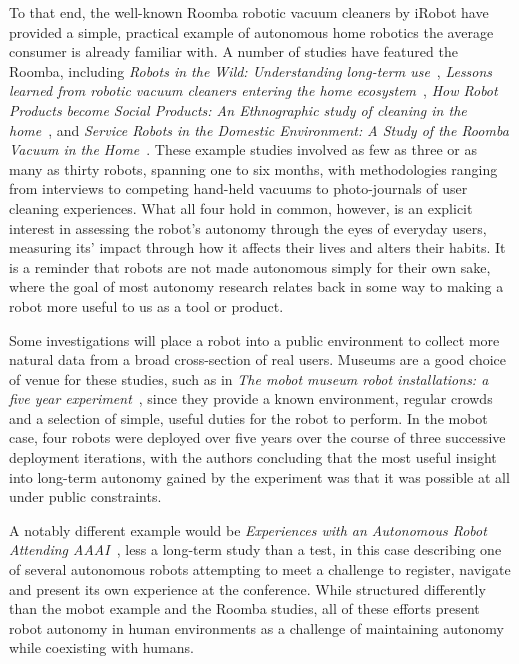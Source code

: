 \documentclass{sfuthesis}
\begin{document}
To that end, the well-known Roomba robotic vacuum cleaners by iRobot have provided a simple, practical example of autonomous home robotics the average consumer is already familiar with. A number of studies have featured the Roomba, including \textit{Robots in the Wild: Understanding long-term use}~\cite{sung2009robots}, \textit{Lessons learned from robotic vacuum cleaners entering the home ecosystem}~\cite{vaussard2014lessons}, \textit{How Robot Products become Social Products: An Ethnographic study of cleaning in the home}~\cite{forlizzi2007robotic}, and \textit{Service Robots in the Domestic Environment: A Study of the Roomba Vacuum in the Home}~\cite{forlizzi2006service}. These example studies involved as few as three or as many as thirty robots, spanning one to six months, with methodologies ranging from interviews to competing hand-held vacuums to photo-journals of user cleaning experiences. What all four hold in common, however, is an explicit interest in assessing the robot's autonomy through the eyes of everyday users, measuring its' impact through how it affects their lives and alters their habits. It is a reminder that robots are not made autonomous simply for their own sake, where the goal of most autonomy research relates back in some way to making a robot more useful to us as a tool or product.

Some investigations will place a robot into a public environment to collect more natural data from a broad cross-section of real users. Museums are a good choice of venue for these studies, such as in \textit{The mobot museum robot installations: a five year experiment}~\cite{nourbakhsh2003mobot}, since they provide a known environment, regular crowds and a selection of simple, useful duties for the robot to perform. In the mobot case, four robots were deployed over five years over the course of three successive deployment iterations, with the authors concluding that the most useful insight into long-term autonomy gained by the experiment was that it was possible at all under public constraints. 

A notably different example would be \textit{Experiences with an Autonomous Robot Attending AAAI}~\cite{michaud2001experiences}, less a long-term study than a test, in this case describing one of several autonomous robots attempting to meet a challenge to register, navigate and present its own experience at the conference. While structured differently than the mobot example and the Roomba studies, all of these efforts present robot autonomy in human environments as a challenge of maintaining autonomy while coexisting with humans.
\end{document}
